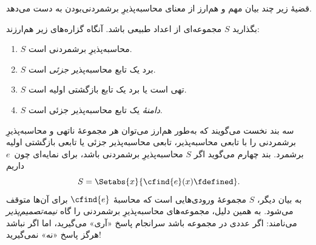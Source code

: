 \documentclass[../../../include/open-logic-section]{subfiles}
\begin{document}


قضیهٔ زیر چند بیان مهم و هم‌ارز از معنای محاسبه‌پذیرِ برشمردنی‌بودن
به دست می‌دهد.

\begin{thm}
بگذارید $S$ مجموعه‌ای از اعداد طبیعی باشد. آنگاه گزاره‌های زیر
هم‌ارزند:
\begin{enumerate}
\item{} $S$ محاسبه‌پذیرِ برشمردنی است.
\item{} $S$ برد یک تابع محاسبه‌پذیر \emph{جزئی} است.
\item{} $S$ تهی است یا برد یک تابع بازگشتی اولیه است.
\item{} $S$ \emph{دامنهٔ} یک تابع محاسبه‌پذیر جزئی است.
\end{enumerate}
\end{thm}

\begin{explain}
سه بند نخست می‌گویند که به‌طور هم‌ارز می‌توان هر مجموعهٔ ناتهی و
محاسبه‌پذیرِ برشمردنی را با تابعی محاسبه‌پذیر، تابعی محاسبه‌پذیر جزئی
یا تابعی بازگشتی اولیه برشمرد. بند چهارم می‌گوید اگر $S$
محاسبه‌پذیرِ برشمردنی باشد، برای نمایه‌ای چون~$e$ داریم
\[
S = \Setabs{x}{\cfind{e}(x) \fdefined}.
\]
به بیان دیگر، $S$ مجموعهٔ ورودی‌هایی است که محاسبهٔ $\cfind{e}$
برای آن‌ها متوقف می‌شود. به همین دلیل، مجموعه‌های محاسبه‌پذیرِ
برشمردنی را گاه \emph{نیمه‌تصمیم‌پذیر} می‌نامند: اگر عددی در مجموعه
باشد سرانجام پاسخ «آری» می‌گیرید، اما اگر نباشد هرگز پاسخ «نه»
نمی‌گیرید!{}
\end{explain}
\end{document}
